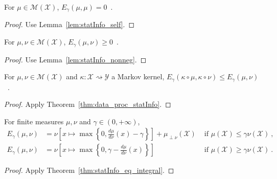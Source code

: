 \begin{lemma}
  \label{lem:eGamma_self}
  For $\mu \in \mathcal M(\mathcal X)$, $E_\gamma(\mu, \mu) = 0$~.
\end{lemma}

\begin{proof}%
{}
Use Lemma~\ref{lem:statInfo_self}.
\end{proof}

\begin{lemma}
  \label{lem:eGamma_nonneg}
  For $\mu, \nu \in \mathcal M(\mathcal X)$, $E_\gamma(\mu, \nu) \ge 0$~.
\end{lemma}

\begin{proof}%
{}
Use Lemma~\ref{lem:statInfo_nonneg}.
\end{proof}

\begin{theorem}
  \label{thm:data_proc_eGamma}
  \leanok
  For $\mu, \nu \in \mathcal M(\mathcal X)$ and $\kappa : \mathcal X \rightsquigarrow \mathcal Y$ a Markov kernel, $E_\gamma(\kappa \circ \mu, \kappa \circ \nu) \le E_\gamma(\mu, \nu)$~.
\end{theorem}

\begin{proof}\leanok
{}
Apply Theorem~\ref{thm:data_proc_statInfo}.
\end{proof}

\begin{lemma}
  \label{lem:eGamma_eq_integral}
  For finite measures $\mu, \nu$ and $\gamma \in (0,+\infty)$,
  \begin{align*}
  E_\gamma(\mu, \nu)
  &= \nu\left[ x \mapsto \max \left\{0 , \frac{d \mu}{d\nu}(x) - \gamma \right\} \right] + \mu_{\perp \nu}(\mathcal X) & \text{ if } \mu(\mathcal X) \le \gamma \nu(\mathcal X)
  \: , \\
  E_\gamma(\mu, \nu)
  &= \nu\left[ x \mapsto \max \left\{0 , \gamma - \frac{d \mu}{d\nu}(x) \right\} \right] & \text{ if } \mu(\mathcal X) \ge \gamma \nu(\mathcal X)
  \: .
  \end{align*}
\end{lemma}

\begin{proof}%
{}
Apply Theorem~\ref{thm:statInfo_eq_integral}.
\end{proof}



